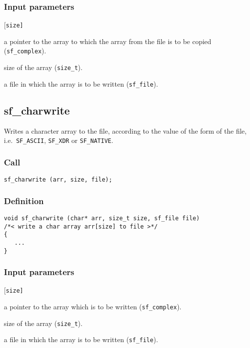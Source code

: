\subsubsection*{Input parameters}
\begin{desclist}{\tt }{\quad}[\tt size]
   \setlength\itemsep{0pt}
   \item[arr] a pointer to the array to which the array from the file is to be copied (\texttt{sf\_complex}). 
   \item[size] size of the array (\texttt{size\_t}). 
   \item[file] a file in which the array is to be written (\texttt{sf\_file}).
\end{desclist}




\subsection{{sf\_charwrite}}
Writes a character array to the file, according to the value of the form of the file, i.e.~\texttt{SF\_ASCII}, \texttt{SF\_XDR} or \texttt{SF\_NATIVE}.    

\subsubsection*{Call}
\begin{verbatim}sf_charwrite (arr, size, file);\end{verbatim}

\subsubsection*{Definition}
\begin{verbatim}
void sf_charwrite (char* arr, size_t size, sf_file file)
/*< write a char array arr[size] to file >*/
{
   ...
}
\end{verbatim}

\subsubsection*{Input parameters}
\begin{desclist}{\tt }{\quad}[\tt size]
   \setlength\itemsep{0pt}
   \item[arr]  a pointer to the array which is to be written (\texttt{sf\_complex}). 
   \item[size] size of the array (\texttt{size\_t}). 
   \item[file] a file in which the array is to be written (\texttt{sf\_file}).
\end{desclist}




